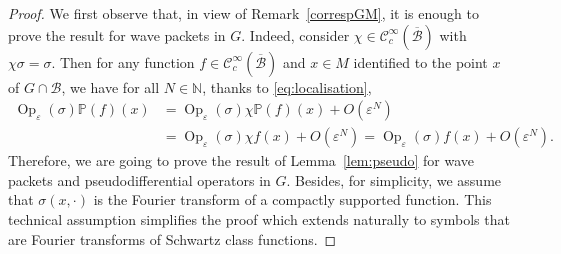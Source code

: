 \documentclass[JEP,XML,SOM,Unicode,published]{cedram}
\let\mathcal\mathscr
\DeclareMathOperator{\Op}{Op}
\theoremstyle{plain}
\theoremstyle{definition}
\let\eps\varepsilon
\def\N{{\mathbb N}}
\def\bbP{{\mathbb P}}
\begin{document}
\begin{proof}
We first observe that, in view of Remark~\ref{correspGM}, it is enough to prove the result for wave packets in $G$. Indeed, consider $\chi\in\mathcal C^\infty_c(\overline{\mathcal B})$ with $\chi\sigma=\sigma$. Then for any function $f\in \mathcal C^\infty_c(\overline{\mathcal B})$ and $x\in M$ identified to the point $x$ of $G\cap \mathcal B$, we have for all $N\in\N$, thanks to \eqref{eq:localisation},
\begin{align*}
\Op_\eps(\sigma) \bbP (f) (x) & = \Op_\eps (\sigma) \chi \bbP(f) (x) +O(\eps ^N)\\
&= \Op_\eps (\sigma) \chi f (x) +O(\eps ^N)= \Op_\eps(\sigma) f(x) +O(\eps^N).
\end{align*}
Therefore, we are going to prove the result of Lemma~\ref{lem:pseudo} for wave packets and pseudodifferential operators in $G$.
Besides,
for simplicity, we assume that $\sigma(x,\cdot)$ is the Fourier transform of a compactly supported function. This technical assumption simplifies the proof which extends naturally to symbols that are Fourier transforms of Schwartz class functions.


\end{proof}
\end{document}
